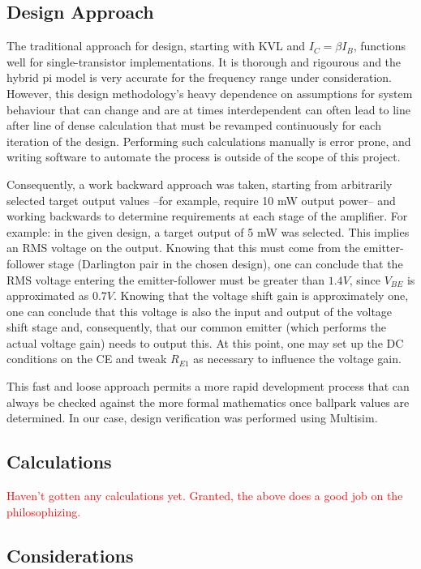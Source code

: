 \documentclass[journal]{IEEEtran}
\begin{document}
\subsection{Design Approach}

The traditional approach for design, starting with KVL and $I_{C}=\beta I_{B}$, functions well for single-transistor implementations. It is thorough and rigourous and the hybrid pi model is very accurate for the frequency range under consideration. However, this design methodology's heavy dependence on assumptions for system behaviour that can change and are at times interdependent can often lead to line after line of dense calculation that must be revamped continuously for each iteration of the design. Performing such calculations manually is error prone, and writing software to automate the process is outside of the scope of this project. 

Consequently, a work backward approach was taken, starting from arbitrarily selected target output values --for example, require 10 mW output power-- and working backwards to determine requirements at each stage of the amplifier. For example: in the given design, a target output of 5 mW was selected. This implies an RMS voltage on the output. Knowing that this must come from the emitter-follower stage (Darlington pair in the chosen design), one can conclude that the RMS voltage entering the emitter-follower must be greater than $1.4 V$, since $V_{BE}$ is approximated as $0.7 V$. Knowing that the voltage shift gain is approximately one, one can conclude that this voltage is also the input and output of the voltage shift stage and, consequently, that our common emitter (which performs the actual voltage gain) needs to output this. At this point, one may set up the DC conditions on the CE and tweak $R_{E1}$ as necessary to influence the voltage gain.

This fast and loose approach permits a more rapid development process that can always be checked against the more formal mathematics once ballpark values are determined. In our case, design verification was performed using Multisim.

\subsection{Calculations}

\textcolor{red}{Haven't gotten any calculations yet. Granted, the above does a good job on the philosophizing.}

\subsection{Considerations}
\end{document}

